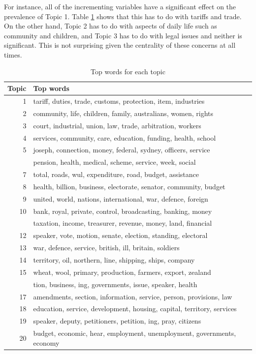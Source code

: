 \documentclass[12pt,]{article}
\theoremstyle{definition}
\theoremstyle{definition}
\theoremstyle{definition}
\theoremstyle{remark}
\begin{document}
For instance, all of the incrementing variables have a significant
effect on the prevalence of Topic 1. Table \ref{tab:topwordssig} shows
that this has to do with tariffs and trade. On the other hand, Topic 2
has to do with aspects of daily life such as community and children, and
Topic 3 has to do with legal issues and neither is significant. This is
not surprising given the centrality of these concerns at all times.

\begin{table}

\caption{\label{tab:topwordssig}Top words for each topic}
\centering
\fontsize{12}{14}\selectfont
\begin{tabular}[t]{rl}
\toprule
Topic & Top words\\
\midrule
1 & tariff, duties, trade, customs, protection, item, industries\\
2 & community, life, children, family, australians, women, rights\\
3 & court, industrial, union, law, trade, arbitration, workers\\
4 & services, community, care, education, funding, health, school\\
5 & joseph, connection, money, federal, sydney, officers, service\\
\addlinespace
6 & pension, health, medical, scheme, service, week, social\\
7 & total, roads, wul, expenditure, road, budget, assistance\\
8 & health, billion, business, electorate, senator, community, budget\\
9 & united, world, nations, international, war, defence, foreign\\
10 & bank, royal, private, control, broadcasting, banking, money\\
\addlinespace
11 & taxation, income, treasurer, revenue, money, land, financial\\
12 & speaker, vote, motion, senate, election, standing, electoral\\
13 & war, defence, service, british, ill, britain, soldiers\\
14 & territory, oil, northern, line, shipping, ships, company\\
15 & wheat, wool, primary, production, farmers, export, zealand\\
\addlinespace
16 & tion, business, ing, governments, issue, speaker, health\\
17 & amendments, section, information, service, person, provisions, law\\
18 & education, service, development, housing, capital, territory, services\\
19 & speaker, deputy, petitioners, petition, ing, pray, citizens\\
20 & budget, economic, hear, employment, unemployment, governments, economy\\
\bottomrule
\end{tabular}
\end{table}
\end{document}
